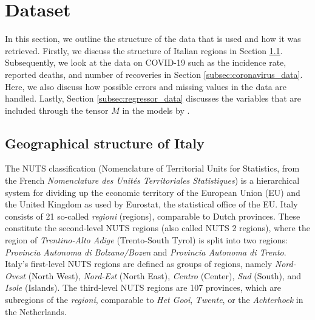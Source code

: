 \documentclass[12pt]{article}
\begin{document}
	\section{Dataset} \label{sec:dataset}
	In this section, we outline the structure of the data that is used and how it was retrieved. Firstly, we discuss the structure of Italian regions in Section \ref{subsec:italy_geography}. Subsequently, we look at the data on COVID-19 such as the incidence rate, reported deaths, and number of recoveries in Section \ref{subsec:coronavirus_data}. Here, we also discuss how possible errors and missing values in the data are handled. Lastly, Section \ref{subsec:regressor_data} discusses the variables that are included through the tensor $M$ in the models by \textcite{adda2016economic}.
	
	\subsection{Geographical structure of Italy} \label{subsec:italy_geography}
	The NUTS classification (Nomenclature of Territorial Units for Statistics, from the French \textit{Nomenclature des Unités Territoriales Statistiques}) is a hierarchical system for dividing up the economic territory of the European Union (EU) and the United Kingdom \parencite{background-nuts} as used by Eurostat, the statistical office of the EU. Italy consists of 21 so-called \textit{regioni} (regions), comparable to Dutch provinces. These constitute the second-level NUTS regions (also called NUTS 2 regions), where the region of \textit{Trentino-Alto Adige} (Trento-South Tyrol) is split into two regions: \textit{Provincia Autonoma di Bolzano/Bozen} and \textit{Provincia Autonoma di Trento}. Italy's first-level NUTS regions are defined as groups of regions, namely \textit{Nord-Ovest} (North West), \textit{Nord-Est} (North East), \textit{Centro} (Center), \textit{Sud} (South), and \textit{Isole} (Islands). The third-level NUTS regions are 107 provinces, which are subregions of the \textit{regioni}, comparable to \textit{Het Gooi}, \textit{Twente}, or the \textit{Achterhoek} in the Netherlands.
	
\end{document}

